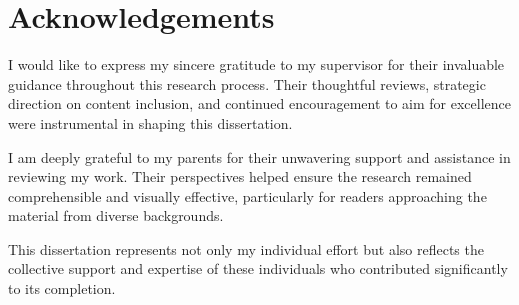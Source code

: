 \chapter*{Acknowledgements}

I would like to express my sincere gratitude to my supervisor for their invaluable guidance throughout this research
process. Their thoughtful reviews, strategic direction on content inclusion, and continued encouragement to aim for
excellence were instrumental in shaping this dissertation.

I am deeply grateful to my parents for their unwavering support and assistance in reviewing my work. Their perspectives
helped ensure the research remained comprehensible and visually effective, particularly for readers approaching the
material from diverse backgrounds.

This dissertation represents not only my individual effort but also reflects the collective support and expertise of
these individuals who contributed significantly to its completion.
